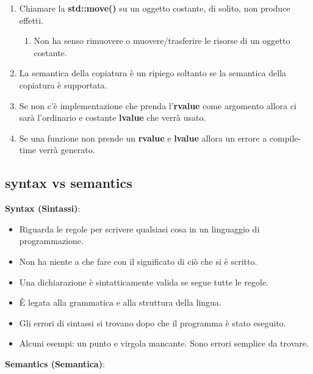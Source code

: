 \begin{enumerate}
	\item \textsf{\small Chiamare la \textbf{std::move()} su un oggetto costante, di solito, non produce effetti.}
	\begin{enumerate}
		\item \textsf{\small Non ha senso rimuovere o muovere/trasferire le risorse di un oggetto costante.}
	\end{enumerate}
	\item \textsf{\small La semantica della copiatura è un ripiego soltanto se la semantica della copiatura è supportata.}
	\item \textsf{\small Se non c'è implementazione che prenda l'\textbf{rvalue} come argomento allora ci sarà l'ordinario e costante \textbf{lvalue} che verrà usato.}
	\item \textsf{\small Se una funzione non prende un \textbf{rvalue} e \textbf{lvalue} allora un errore a compile-time verrà generato.}
\end{enumerate}

\subsection{syntax vs semantics}

\textsf{\small \textbf{Syntax (Sintassi)}: } \\

\begin{itemize}
	\item \textsf{\small Riguarda le regole per scrivere qualsiasi cosa in un linguaggio di programmazione.}
	\item \textsf{\small Non ha niente a che fare con il significato di ciò che si è scritto.}
	\item \textsf{\small Una dichiarazione è sintatticamente valida se segue tutte le regole.}
	\item \textsf{\small È legata alla grammatica e alla struttura della lingua.}
	\item \textsf{\small Gli errori di sintassi si trovano dopo che il programma è stato eseguito.}
	\item \textsf{\small Alcuni esempi: un punto e virgola mancante. Sono errori semplice da trovare.}
\end{itemize}

\textsf{\small \textbf{Semantics (Semantica)}: } \\

